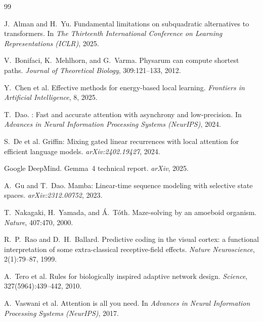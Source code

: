 \documentclass[11pt]{article}
\begin{document}

\begin{thebibliography}{99}

J.~Alman and H.~Yu.
\newblock Fundamental limitations on subquadratic alternatives to transformers.
\newblock In \textit{The Thirteenth International Conference on Learning Representations (ICLR)}, 2025.

V.~Bonifaci, K.~Mehlhorn, and G.~Varma.
\newblock Physarum can compute shortest paths.
\newblock \textit{Journal of Theoretical Biology}, 309:121--133, 2012.

Y.~Chen et al.
\newblock Effective methods for energy-based local learning.
\newblock \textit{Frontiers in Artificial Intelligence}, 8, 2025.

T.~Dao.
: Fast and accurate attention with asynchrony and low-precision.
\newblock In \textit{Advances in Neural Information Processing Systems (NeurIPS)}, 2024.

S.~De et al.
\newblock Griffin: Mixing gated linear recurrences with local attention for efficient language models.
\newblock \textit{arXiv:2402.19427}, 2024.

Google DeepMind.
\newblock Gemma~4 technical report.
\newblock \textit{arXiv}, 2025.

A.~Gu and T.~Dao.
\newblock Mamba: Linear-time sequence modeling with selective state spaces.
\newblock \textit{arXiv:2312.00752}, 2023.

T.~Nakagaki, H.~Yamada, and {\'A}.~T{\'o}th.
\newblock Maze-solving by an amoeboid organism.
\newblock \textit{Nature}, 407:470, 2000.

R.~P.~Rao and D.~H.~Ballard.
\newblock Predictive coding in the visual cortex: a functional interpretation of some extra-classical receptive-field effects.
\newblock \textit{Nature Neuroscience}, 2(1):79--87, 1999.

A.~Tero et al.
\newblock Rules for biologically inspired adaptive network design.
\newblock \textit{Science}, 327(5964):439--442, 2010.

A.~Vaswani et al.
\newblock Attention is all you need.
\newblock In \textit{Advances in Neural Information Processing Systems (NeurIPS)}, 2017.

\end{thebibliography}
\end{document}
